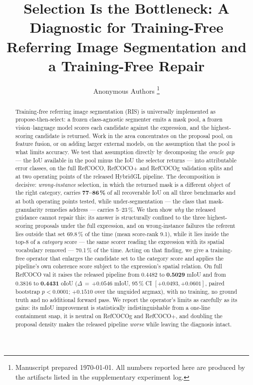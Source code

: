 \documentclass[journal]{IEEEtran}
\newcommand{\best}[1]{\textbf{#1}}
\newcommand{\dD}{\Delta}
\begin{document}
\title{Selection Is the Bottleneck: A Diagnostic for Training-Free Referring
Image Segmentation and a Training-Free Repair}

\author{Anonymous Authors%
\thanks{Manuscript prepared \today. All numbers reported here are produced by
the artifacts listed in the supplementary experiment log.}}

\maketitle

\begin{abstract}
Training-free referring image segmentation (RIS) is universally implemented as
propose-then-select: a frozen class-agnostic segmenter emits a mask pool, a
frozen vision--language model scores each candidate against the expression, and
the highest-scoring candidate is returned. Work in the area concentrates on the
proposal pool, on feature fusion, or on adding larger external models, on the
assumption that the pool is what limits accuracy. We test that assumption
directly by decomposing the \emph{oracle gap} --- the IoU available in the pool
minus the IoU the selector returns --- into attributable error classes, on the
full RefCOCO, RefCOCO$+$ and RefCOCOg validation splits and at two operating
points of the released HybridGL pipeline. The decomposition is decisive:
\emph{wrong-instance} selection, in which the returned mask is a different
object of the right category, carries \textbf{77--86\,\%} of all recoverable
IoU on all three benchmarks and at both operating points tested, while
under-segmentation --- the class that mask-granularity remedies address ---
carries 5--23\,\%. We then
show \emph{why} the released guidance cannot repair this: its answer is
structurally confined to the three highest-scoring proposals under the full
expression, and on wrong-instance failures the referent lies outside that set
69.8\,\% of the time (mean score-rank 9.1), while it lies inside the top-8 of a
\emph{category} score --- the same scorer reading the expression with its
spatial vocabulary removed --- 70.1\,\% of the time. Acting on that finding, we
give a training-free operator that enlarges the candidate set to the category
score and applies the pipeline's own coherence score subject to the
expression's spatial relation. On full RefCOCO val it raises the released
pipeline from 0.4482 to \best{0.5029} mIoU and from 0.3816 to \best{0.4431}
oIoU ($\dD$\,$=$\,$+0.0546$ mIoU, 95\,\% CI $[+0.0493,+0.0601]$, paired
bootstrap $p<0.0001$; $+0.1510$ over the unguided argmax), with no training, no
ground truth and no additional forward pass. We report the operator's limits as
carefully as its gains: its mIoU improvement is statistically
indistinguishable from a one-line containment snap, it is neutral on RefCOCOg
and RefCOCO$+$, and doubling the proposal density makes the released pipeline
\emph{worse} while leaving the diagnosis intact.
\end{abstract}
\end{document}
